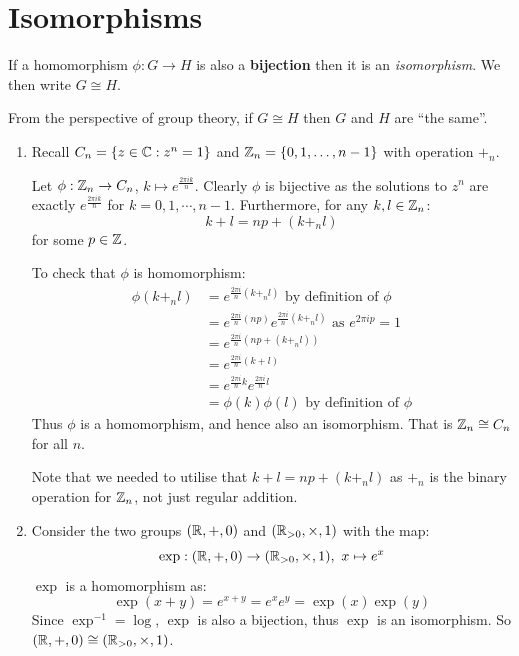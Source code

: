 \documentclass[../main.tex]{subfiles}
\begin{document}
\section{Isomorphisms}
\begin{definition}[Isomorphism]
  If a homomorphism $\phi: G \to H$ is also a \textbf{bijection} then it is an \textit{isomorphism}.
  We then write $G \cong H$.
\end{definition}
From the perspective of group theory, if $G \cong H$ then $G$ and $H$ are ``the same''.
\begin{example}
  \begin{enumerate}
    \item Recall $C_n = \{z \in \mathbb{C} : z^{n} = 1\}$ and $\mathbb{Z}_n = \{0, 1, \ldots, n - 1\}$ with operation $+_n$.

      Let $\phi: \mathbb{Z}_n \to C_n$, $k \mapsto e^{\frac{2\pi i k}{n}}$.
      Clearly $\phi$ is bijective as the solutions to $z^{n}$ are exactly $e^{\frac{2\pi i k}{n}}$ for $k = 0, 1, \cdots, n-1$.
      Furthermore, for any $k, l \in \mathbb{Z}_n$:
      \[
        k + l = np + (k +_n l)
      \]
      for some $p \in \mathbb{Z}$.

      To check that $\phi$ is homomorphism:
      \begin{align*}
        \phi(k +_n l) &= e^{\frac{2 \pi i}{n}(k +_n l)} \text{ by definition of $\phi$}\\
                      &= e^{\frac{2 \pi i}{n}(np)} e^{\frac{2 \pi i}{n}(k +_n l)} \text{ as $e^{2\pi i p} = 1$} \\
                      &= e^{\frac{2 \pi i}{n}(np + (k +_n l))} \\
                      &=e^{\frac{2 \pi i}{n}(k + l)} \\
                      &= e^{\frac{2 \pi i}{n} k} e^{\frac{2 \pi i}{n} l} \\
                      &= \phi(k) \phi(l) \text{ by definition of $\phi$}
      \end{align*}
      Thus $\phi$ is a homomorphism, and hence also an isomorphism.
      That is $\mathbb{Z}_n \cong C_n$ for all $n$.

      Note that we needed to utilise that $k + l = np + (k +_n l)$ as $+_n$ is the binary operation for $\mathbb{Z}_n$, not just regular addition.
    \item Consider the two groups $(\mathbb{R}, +, 0)$ and $(\mathbb{R}_{> 0}, \times, 1)$ with the map:
      \[
        \exp: (\mathbb{R}, +, 0) \to (\mathbb{R}_{> 0}, \times, 1),\ x \mapsto e^{x}
      \]
      $\exp$ is a homomorphism as:
      \[
        \exp(x + y) = e^{x + y} = e^{x}e^{y} = \exp(x)\exp(y)
      \]
      Since $\exp^{-1} = \log$, $\exp$ is also a bijection, thus $\exp$ is an isomorphism.
      So $(\mathbb{R}, + , 0) \cong (\mathbb{R}_{>0}, \times, 1)$.
  \end{enumerate}
\end{example}
\end{document}
